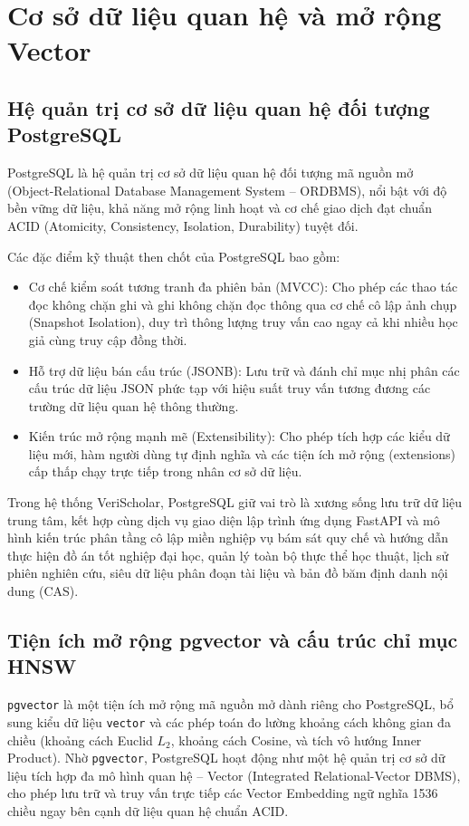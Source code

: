 \section{Cơ sở dữ liệu quan hệ và mở rộng Vector}
\label{sec:postgresql_redis}

\subsection{Hệ quản trị cơ sở dữ liệu quan hệ đối tượng PostgreSQL}
\label{subsec:postgresql}
PostgreSQL là hệ quản trị cơ sở dữ liệu quan hệ đối tượng mã nguồn mở (Object-Relational Database Management System -- ORDBMS), nổi bật với độ bền vững dữ liệu, khả năng mở rộng linh hoạt và cơ chế giao dịch đạt chuẩn ACID (Atomicity, Consistency, Isolation, Durability) tuyệt đối.

Các đặc điểm kỹ thuật then chốt của PostgreSQL bao gồm:
\begin{itemize}
    \item Cơ chế kiểm soát tương tranh đa phiên bản (MVCC): Cho phép các thao tác đọc không chặn ghi và ghi không chặn đọc thông qua cơ chế cô lập ảnh chụp (Snapshot Isolation), duy trì thông lượng truy vấn cao ngay cả khi nhiều học giả cùng truy cập đồng thời.
    \item Hỗ trợ dữ liệu bán cấu trúc (JSONB): Lưu trữ và đánh chỉ mục nhị phân các cấu trúc dữ liệu JSON phức tạp với hiệu suất truy vấn tương đương các trường dữ liệu quan hệ thông thường.
    \item Kiến trúc mở rộng mạnh mẽ (Extensibility): Cho phép tích hợp các kiểu dữ liệu mới, hàm người dùng tự định nghĩa và các tiện ích mở rộng (extensions) cấp thấp chạy trực tiếp trong nhân cơ sở dữ liệu.
\end{itemize}

Trong hệ thống VeriScholar, PostgreSQL giữ vai trò là xương sống lưu trữ dữ liệu trung tâm, kết hợp cùng dịch vụ giao diện lập trình ứng dụng FastAPI và mô hình kiến trúc phân tầng cô lập miền nghiệp vụ bám sát quy chế và hướng dẫn thực hiện đồ án tốt nghiệp đại học, quản lý toàn bộ thực thể học thuật, lịch sử phiên nghiên cứu, siêu dữ liệu phân đoạn tài liệu và bản đồ băm định danh nội dung (CAS).

\subsection{Tiện ích mở rộng pgvector và cấu trúc chỉ mục HNSW}
\label{subsec:pgvector_hnsw}
\texttt{pgvector} là một tiện ích mở rộng mã nguồn mở dành riêng cho PostgreSQL, bổ sung kiểu dữ liệu \texttt{vector} và các phép toán đo lường khoảng cách không gian đa chiều (khoảng cách Euclid $L_2$, khoảng cách Cosine, và tích vô hướng Inner Product). Nhờ \texttt{pgvector}, PostgreSQL hoạt động như một hệ quản trị cơ sở dữ liệu tích hợp đa mô hình quan hệ -- Vector (Integrated Relational-Vector DBMS), cho phép lưu trữ và truy vấn trực tiếp các Vector Embedding ngữ nghĩa 1536 chiều ngay bên cạnh dữ liệu quan hệ chuẩn ACID.

